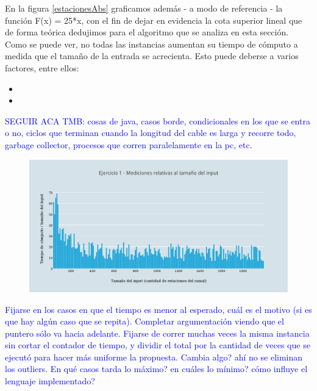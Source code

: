  En la figura \ref{estacionesAbs} graficamos además - a modo de referencia - la función F(x) = 25*x, con el fin de dejar en evidencia la cota superior lineal que de forma teórica dedujimos para el algoritmo que se analiza en esta sección. \\
 Como se puede ver, no todas las instancias aumentan su tiempo de cómputo a medida que el tamaño de la entrada se acrecienta. Esto puede deberse a varios factores, entre ellos:
 \begin{itemize}
 \item {}
 \item{}
\end{itemize}
\textcolor{blue}{SEGUIR ACA TMB: cosas de java, casos borde, condicionales en los que se entra o no, ciclos que terminan cuando la longitud del cable es larga y recorre todo, garbage collector, procesos que corren paralelamente en la pc, etc.}
 
  \begin{figure}[h!]
   \begin{center}
 	\includegraphics[scale=0.8]{imagenes/ej1/relativas.png}
	\label{estacionesRel}
   \end{center}
 \end{figure}


\newpage

{\huge \textcolor{blue}{Fijarse en los casos en que el tiempo es menor al esperado, cuál es el motivo (si es que hay algún caso que se repita). Completar argumentación viendo que el puntero sólo va hacia adelante. Fijarse de correr muchas veces la misma instancia sin cortar el contador de tiempo, y dividir el total por la cantidad de veces que se ejecutó para hacer más uniforme la propuesta. Cambia algo? ahí no se eliminan los outliers. En qué casos tarda lo máximo? en cuáles lo mínimo? cómo influye el lenguaje implementado?}}
